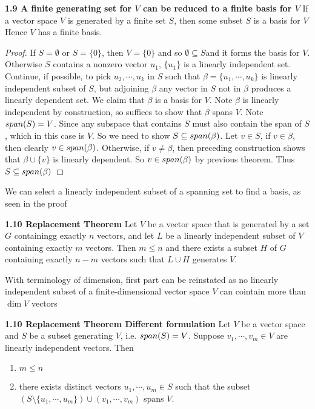 \documentclass[11pt]{article}
\begin{document}
\begin{theorem*}
    \textbf{1.9 A finite generating set for $V$ can be reduced to a finite basis for $V$} If a vector space $V$ is generated by a finite set $S$, then some subset $S$ is a basis for $V$ Hence $V$ has a finite basis. 
    \begin{proof}
        If $S=\emptyset$ or $S = \{ 0\}$, then $V = \{0\}$ and so $\emptyset \subseteq S$and it forms the basis for $V$. Otherwise $S$ contains a nonzero vector $u_1$, $\{u_1\}$ is a linearly independent set. Continue, if possible, to pick $u_2,\cdots, u_k$ in $S$ such that $\beta=\{u_1, \cdots, u_k\}$ is linearly independent subset of $S$, but adjoining $\beta$ any vector in $S$ not in $\beta$ produces a linearly dependent set. We claim that $\beta$ is a basis for $V$. Note $\beta$ is linearly independent by construction, so suffices to show that $\beta$ spans $V$. Note $span(S) = V$. Since any subspace that contains $S$ must also contain the span of $S$, which in this case is $V$. So we need to show $S\subseteq span(\beta)$. Let $v\in S$, if $v\in \beta$, then clearly $v\in span(\beta)$. Otherwise, if $v\neq \beta$, then preceding construction shows that $\beta \cup \{v\}$ is linearly dependent. So $v\in span(\beta)$ by previous theorem. Thus $S\subseteq span(\beta)$ 
    \end{proof}
    $ $\\
    We can select a linearly independent subset of a spanning set to find a basis, as seen in the proof
\end{theorem*}


\begin{theorem*}
    \textbf{1.10 Replacement Theorem} Let $V$ be a vector space that is generated by a set $G$ containingg exactly $n$ vectors, and let $L$ be a linearly independent subset of $V$ containing exactly $m$ vectors. Then $m\leq n$  and there exists a subset $H$ of $G$ containing exactly $n-m$ vectors such that $L\cup H$ generates $V$. 
    \begin{rem}
        With terminology of dimension, first part can be reinstated as no linearly independent subset of a finite-dimensional vector space $V$ can cointain more than $\dim{V}$ vectors
    \end{rem}
\end{theorem*}

\begin{theorem*}
    \textbf{1.10 Replacement Theorem Different formulation} Let $V$ be a vector space and $S$ be a subset generating $V$, i.e. $span(S)=V$. Suppose $v_1, \cdots, v_m \in V$ are linearly independent vectors. Then 
    \begin{enumerate}
        \item $m\leq n$ 
        \item there exists distinct vectors $u_1,\cdots, u_m\in S$ such that the subset $(S\setminus \{u_1,\cdots, u_m\}) \cup (v_1,\cdots, v_m)$ spans $V$. 
    \end{enumerate}
\end{theorem*}
    
\end{document}
